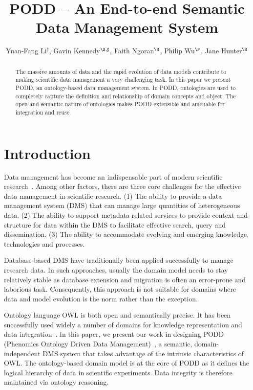 \documentclass{llncs}
\title{PODD -- An End-to-end Semantic Data Management System}
\author{Yuan-Fang Li$^\dagger$, Gavin Kennedy$^{\S,\sharp}$, Faith Ngoran$^\S$, Philip Wu$^\P$, Jane Hunter$^\S$}
\institute{
$^\dagger$Clayton School of IT, Monash University\\
$^\S$School of ITEE, The University of Queensland\\
$^\sharp$High Resolution Plant Phenomics Centre, Canberra\\
$^\P$The John Curtin School of Medical Research, Australian National University%
}
\begin{document}
\maketitle

\begin{abstract}
The massive amounts of data and the rapid evolution of data models contribute to making scientific data management a very challenging task. In this paper we present PODD, an ontology-based data management system. In PODD, ontologies are used to completely capture the definition and relationship of domain concepts and object. The open and semantic nature of ontologies makes PODD extensible and amenable for integration and reuse.
\end{abstract}

\section{Introduction}\label{sec:intro}
Data management has become an indispensable part of modern scientific research~\cite{1107503}. Among other factors, there are three core challenges for the effective data management in scientific research. (1) The ability to provide a data management system (DMS) that can manage large quantities of heterogeneous data. (2) The ability to support metadata-related services to provide context and structure for data within the DMS to facilitate effective search, query and dissemination. (3) The ability to accommodate evolving and emerging knowledge, technologies and processes.

Database-based DMS have traditionally been applied successfully to manage
research data. In such approaches, usually the domain model needs to stay relatively stable as database extension and migration is
often an error-prone and laborious task. Consequently, this approach is
not suitable for domains where data and model evolution is the norm
rather than the exception.

Ontology language OWL is both open and semantically precise. It has been successfully used widely a number of domains for knowledge representation and data integration~\cite{journals/bib/RuttenbergRSM09}. In this paper, we present our work in designing PODD (Phenomics Ontology Driven Data Management)~\cite{Li2011}, a semantic, domain-independent DMS system that takes advantage of the intrinsic characteristics of OWL. The
ontology-based domain model is at the core of PODD as it defines the
logical hierarchy of data in scientific experiments.
Data integrity is therefore maintained via ontology reasoning.
\end{document}
